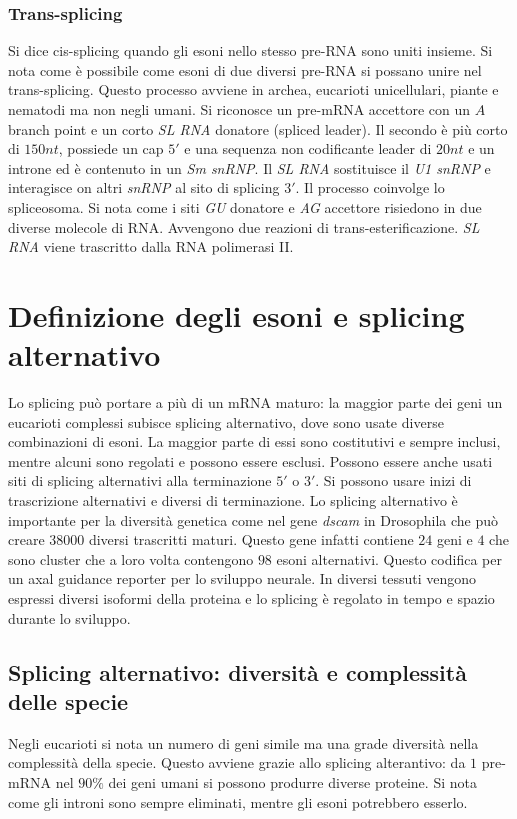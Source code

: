 \subsubsection{Trans-splicing}
Si dice cis-splicing quando gli esoni nello stesso pre-RNA sono uniti insieme. Si nota come \`e possibile come esoni di due diversi pre-RNA si possano unire nel trans-splicing. Questo
processo avviene in archea, eucarioti unicellulari, piante e nematodi ma non negli umani. Si riconosce un pre-mRNA accettore con un $A$ branch point e un corto \emph{SL RNA} donatore 
(spliced leader). Il secondo \`e pi\`u corto di $150nt$, possiede un cap $5'$ e una sequenza non codificante leader di $20nt$ e un introne ed \`e contenuto in un \emph{Sm snRNP}. 
Il \emph{SL RNA} sostituisce il \emph{U1 snRNP} e interagisce on altri \emph{snRNP} al sito di splicing $3'$. Il processo coinvolge lo spliceosoma. Si nota come
i siti \emph{GU} donatore e \emph{AG} accettore risiedono in due diverse molecole di RNA. Avvengono due reazioni di trans-esterificazione. \emph{SL RNA} viene trascritto dalla RNA 
polimerasi II. 
\section{Definizione degli esoni e splicing alternativo}
Lo splicing pu\`o portare a pi\`u di un mRNA maturo: la maggior parte dei geni un eucarioti complessi subisce splicing alternativo, dove sono usate diverse combinazioni di esoni. La
maggior parte di essi sono costitutivi e sempre inclusi, mentre alcuni sono regolati e possono essere esclusi. Possono essere anche usati siti di splicing alternativi alla terminazione
$5'$ o $3'$. Si possono usare inizi di trascrizione alternativi e diversi di terminazione. Lo splicing alternativo \`e importante per la diversit\`a genetica come 
nel gene \emph{dscam} in Drosophila che pu\`o creare \num{38000} diversi trascritti maturi. Questo gene infatti contiene $24$ geni e $4$ che sono cluster che a loro volta contengono
$98$ esoni alternativi. Questo codifica per un axal guidance reporter per lo sviluppo neurale. In diversi tessuti vengono espressi diversi isoformi della proteina e lo splicing 
\`e regolato in tempo e spazio durante lo sviluppo. 
\subsection{Splicing alternativo: diversit\`a e complessit\`a delle specie}
Negli eucarioti si nota un numero di geni simile ma una grade diversit\`a nella complessit\`a della specie. Questo avviene grazie allo splicing alterantivo: da $1$ pre-mRNA nel 
$90\%$ dei geni umani si possono produrre diverse proteine. Si nota come gli introni sono sempre eliminati, mentre gli esoni potrebbero esserlo. 

